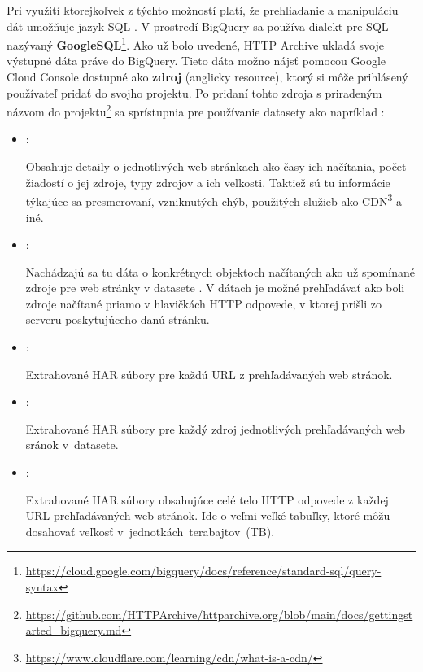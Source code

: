 Pri využití ktorejkoľvek z týchto možností platí, že prehliadanie a manipuláciu dát umožňuje jazyk SQL \cite{google-bq}.
V prostredí BigQuery sa používa dialekt pre SQL nazývaný \textbf{GoogleSQL}\footnote{\href{https://cloud.google.com/bigquery/docs/reference/standard-sql/query-syntax}{https://cloud.google.com/bigquery/docs/reference/standard-sql/query-syntax}}.
Ako už bolo uvedené, HTTP Archive ukladá svoje výstupné dáta práve do BigQuery.
Tieto dáta možno nájsť pomocou Google Cloud Console dostupné ako \textbf{zdroj} (anglicky resource), ktorý si môže prihlásený používateľ pridať do svojho projektu.
Po pridaní tohto zdroja s priradeným názvom  do projektu\footnote{\href{https://github.com/HTTPArchive/httparchive.org/blob/main/docs/gettingstarted\_bigquery.md}{https://github.com/HTTPArchive/httparchive.org/blob/main/docs/gettingstarted\_bigquery.md}} sa sprístupnia pre používanie datasety ako napríklad \cite{httparchive-repo}:

\begin{itemize}
    \item {}:

    Obsahuje detaily o jednotlivých web stránkach ako časy ich načítania, počet žiadostí o jej zdroje, typy zdrojov a ich veľkosti.
    Taktiež sú tu informácie týkajúce sa presmerovaní, vzniknutých chýb, použitých služieb ako CDN\footnote{\href{https://www.cloudflare.com/learning/cdn/what-is-a-cdn/}{https://www.cloudflare.com/learning/cdn/what-is-a-cdn/}} a iné.
    
    \item {}:

    Nachádzajú sa tu dáta o konkrétnych objektoch načítaných ako už spomínané zdroje pre web stránky v datasete .
    V dátach je možné prehľadávať ako boli zdroje načítané priamo v hlavičkách HTTP odpovede, v ktorej prišli zo serveru poskytujúceho danú stránku.
    
    \item {}:

    Extrahované HAR súbory pre každú URL z prehľadávaných web stránok.
    
    \item {}:

    Extrahované HAR súbory pre každý zdroj jednotlivých prehľadávaných web sránok \mbox{v  datasete}.
    
    \item {}:

    Extrahované HAR súbory obsahujúce celé telo HTTP odpovede z každej URL prehľadávaných web stránok.
    Ide o veľmi veľké tabuľky, ktoré môžu dosahovať veľkosť \mbox{v jednotkách terabajtov (TB)}.
\end{itemize}

